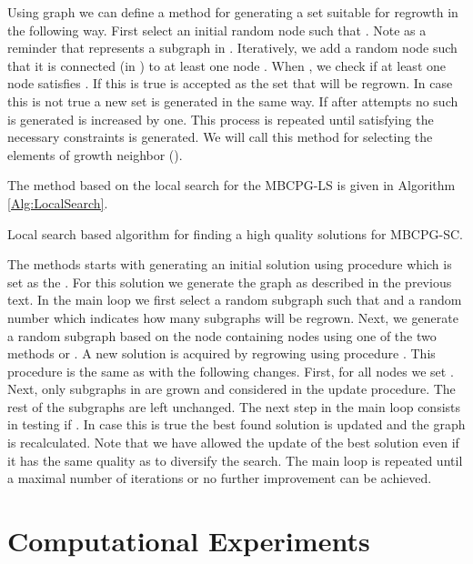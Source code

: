 Using graph  we can define a method for generating a set  suitable for regrowth in the following way. First select an initial  random node  such that . Note as a reminder that  represents a subgraph in . Iteratively, we add a random node  such that it is connected (in ) to at least one node  . When , we check if at least one node   satisfies  . If this is true   is accepted as the set that will be regrown. In case this is not true a new set  is generated in the same way. If after  attempts no such  is generated  is increased by one. This process is repeated until  satisfying the necessary constraints is generated.  We will call this method for selecting the elements of  growth neighbor ().

The method based on the local search  for the MBCPG-LS is given in Algorithm \ref{Alg:LocalSearch}.
\begin{algorithm}
\begin{algorithmic}
\State{ }
	\State{}
	\If{ }
	\State{ }
	\EndIf
\EndWhile
\end{algorithmic}
\caption{\label{Alg:LocalSearch} Local search based algorithm for finding a high quality solutions for MBCPG-SC.}
\end{algorithm}
The methods starts with generating an initial solution using procedure  which is set as the . For this solution we generate the graph  as described in the previous text. In the main loop we first select a random subgraph  such that  and a random number  which indicates how many subgraphs  will be regrown. Next, we generate a random  subgraph   based on the node  containing  nodes  using one of the two methods  or . A new solution  is acquired by regrowing  using procedure . This procedure is the same as  with the following changes. First, for all nodes   we set . Next, only subgraphs in  are grown and considered in the update procedure. The rest of the subgraphs are left unchanged. 
The next step in the main loop consists in  testing if . In case this is true the best found solution is updated and the graph  is recalculated. Note that we have allowed the update of the best solution even if it has the same quality as  to diversify the search. The main loop is repeated until a maximal number of iterations or no further improvement can be achieved. 


\section{Computational Experiments}

